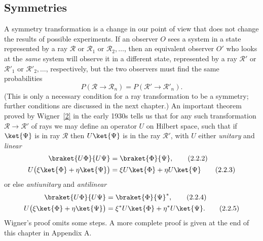 \subsection{Symmetries}

A symmetry transformation is a change in our point of view that does not
change the results of possible experiments. If an observer $O$ sees a system
in a state represented by a ray $\mathcal{R}$ or $\mathcal{R}_1$ or
$\mathcal{R}_2,\ldots$, then an equivalent observer $O'$ who looks at the
\emph{same} system will observe it in a different state, represented by a ray
$\mathcal{R}'$ or $\mathcal{R}'_1$ or $\mathcal{R}'_2,\ldots$, respectively,
but the two observers must find the same probabilities
\begin{equation}
  P(\mathcal{R}\to\mathcal{R}_n)
    =P(\mathcal{R}'\to\mathcal{R}'_n).
  \tag{2.2.1}\label{eq:2.2.1}
\end{equation}
(This is only a necessary condition for a ray transformation to be a
symmetry; further conditions are discussed in the next chapter.) An
important theorem proved by Wigner~\hyperref[ref:2.2]{[2]} in the early 1930s
tells us that for any such transformation $\mathcal{R}\to\mathcal{R}'$ of
rays we may define an operator $U$ on Hilbert space, such that if
$\ket{\Psi}$ is in ray $\mathcal{R}$ then $U\ket{\Psi}$ is in the ray
$\mathcal{R}'$, with $U$ either \emph{unitary} and \emph{linear}
\begin{align}
  \braket{U\Phi}{U\Psi} &= \braket{\Phi}{\Psi},
  \tag{2.2.2}\label{eq:2.2.2}\\
  U\bigl(\xi\ket{\Phi}+\eta\ket{\Psi}\bigr)
    &=\xi U\ket{\Phi}+\eta U\ket{\Psi}
  \tag{2.2.3}\label{eq:2.2.3}
\end{align}
or else \emph{antiunitary} and \emph{antilinear}
\begin{align}
  \braket{U\Phi}{U\Psi} &= \braket{\Phi}{\Psi}^{*},
  \tag{2.2.4}\label{eq:2.2.4}\\
  U\bigl(\xi\ket{\Phi}+\eta\ket{\Psi}\bigr)
    &=\xi^{*}U\ket{\Phi}+\eta^{*}U\ket{\Psi}.
  \tag{2.2.5}\label{eq:2.2.5}
\end{align}
Wigner's proof omits some steps. A more complete proof is given at the
end of this chapter in Appendix A.

